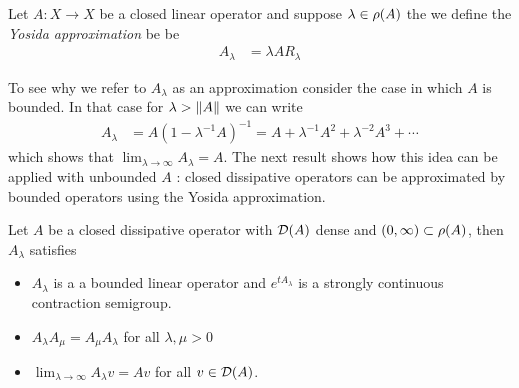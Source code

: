 \begin{defn}Let $A : X \to X$ be a closed linear operator and suppose $\lambda \in \rho(A)$ the we define the \emph{Yosida approximation} be be
\begin{align*}
A_\lambda &= \lambda A R_{\lambda}
\end{align*}
\end{defn}
To see why we refer to $A_\lambda$ as an approximation consider the case in which $A$ is bounded.  In that case for $\lambda > \left \lVert A \right \rVert$ we can write
\begin{align*}
A_\lambda &= A (1 - \lambda^{-1} A)^{-1} = A + \lambda^{-1} A^2 + \lambda^{-2} A^3 + \cdots
\end{align*}
which shows that $\lim_{\lambda \to \infty} A_\lambda = A$.
The next result shows how this idea can be applied with unbounded $A$ : closed dissipative operators can be approximated by bounded operators using the Yosida approximation.
\begin{lem}\label{ClosedDissipativeYosidaApproximation}Let $A$ be a closed dissipative operator with $\mathcal{D}(A)$ dense and $(0,\infty) \subset \rho(A)$, then $A_\lambda$ satisfies
\begin{itemize}
\item[(i)] $A_\lambda$ is a a bounded linear operator and $e^{t A_\lambda}$ is a strongly continuous contraction semigroup.
\item[(ii)] $A_\lambda A_\mu = A_\mu A_\lambda$ for all $\lambda, \mu > 0$
\item[(iii)] $\lim_{\lambda \to \infty} A_\lambda v = A v$ for all $v \in \mathcal{D}(A)$.
\end{itemize}
\end{lem}
